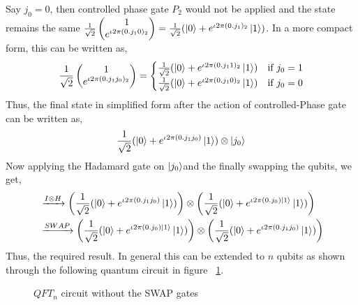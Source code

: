 Say $j_0=0$, then controlled phase gate $P_2$ would not be applied and the state remains the same $\frac{1}{\sqrt{2}}\begin{pmatrix}
    1 \\ e^{\iota 2\pi (0.j_10)_2}
\end{pmatrix}=\frac{1}{\sqrt{2}}(\ket{0}+e^{\iota 2\pi(0.j_1)_2}\ket{1})$. In a more compact form, this can be written as,
\begin{align*}
\frac{1}{\sqrt{2}}\begin{pmatrix} 1 \\ e^{\iota 2 \pi (0.j_1 j_0)_2} \end{pmatrix}&=\begin{cases} \frac{1}{\sqrt{2}}(\ket{0}+e^{\iota 2\pi(0.j_11)_2}\ket{1}) & \text{if $j_0=1$} \\ 
\frac{1}{\sqrt{2}}(\ket{0}+e^{\iota 2 \pi (0.j_10)_2}\ket{1}) &\text{if $j_0=0$} \end{cases}\\
\end{align*}
Thus, the final state in simplified form after the action of controlled-Phase gate can be written as,
\[
\frac{1}{\sqrt{2}}(\ket{0}+e^{\iota 2\pi(0.j_1j_0)}\ket{1})\otimes \ket{j_0}
\]
Now applying the Hadamard gate on $\ket{j_0}$and the finally swapping the qubits, we get,
\begin{align*}
    &\xrightarrow{I\otimes H} \left(\frac{1}{\sqrt{2}}(\ket{0}+e^{\iota 2\pi(0.j_1j_0)}\ket{1})\right)\otimes \left(\frac{1}{\sqrt{2}}(\ket{0}+e^{\iota 2 \pi (0.j_0)\ket{1}}\ket{1})\right)\\
    &\xrightarrow{SWAP} \left(\frac{1}{\sqrt{2}}(\ket{0}+e^{\iota 2 \pi (0.j_0)\ket{1}}\ket{1})\right) \otimes \left(\frac{1}{\sqrt{2}}(\ket{0}+e^{\iota 2\pi(0.j_1j_0)}\ket{1})\right)
\end{align*}
Thus, the required result.
In general this can be extended to $n$ qubits as shown through the following quantum circuit in figure ~\ref{fig:qft_N}.
\begin{figure}[ht]
    \centering
    \caption{$QFT_n$ circuit without the SWAP gates}
    \label{fig:qft_N}
\end{figure}
